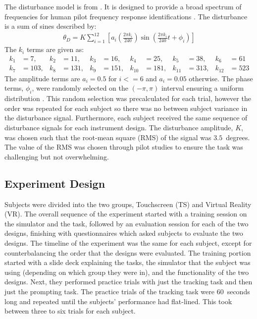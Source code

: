 The disturbance model is from \citet{sweet_identification_1999}.
It is designed to provide a broad spectrum of frequencies for human pilot frequency response identifications \citep{mcruer_mathematical_1974}.
The disturbance is a sum of sines described by:
\begin{align}
    \theta_D = K\sum\limits_{i=1}^{12} \left[ a_i \left(\frac{2\pi k_i}{240} \right) \sin\left( \frac{2\pi k_i}{240}t + \phi_i \right) \right]
\end{align}
The $k_i$ terms are given as:
\begin{align*}
    k_1 &= 7,   & k_2 &= 11,  & k_3 &= 16,  & k_4    &= 25,  & k_5    &= 38,  & k_6    &= 61 \\
    k_7 &= 103, & k_8 &= 131, & k_9 &= 151, & k_{10} &= 181, & k_{11} &= 313, & k_{12} &= 523
\end{align*}
The amplitude terms are $a_i=0.5$ for $i <= 6$ and $a_i=0.05$ otherwise.
The phase terms, $\phi_i$, were randomly selected on the $(-\pi, \pi)$ interval ensuring a uniform distribution \citep{sweet_identification_1999}.
This random selection was precalculated for each trial, however the order was repeated for each subject so there was no between subject variance in the disturbance signal.
Furthermore, each subject received the same sequence of disturbance signals for each instrument design.
The disturbance amplitude, $K$, was chosen such that the root-mean square (RMS) of the signal was $3.5$~degrees.
The value of the RMS was chosen through pilot studies to ensure the task was challenging but not overwhelming.

\subsection{Experiment Design}

Subjects were divided into the two groups, Touchscreen (TS) and Virtual Reality (VR).
The overall sequence of the experiment started with a training session on the simulator and the task, followed by an evaluation session for each of the two designs, finishing with questionnaires which asked subjects to evaluate the two designs.
The timeline of the experiment was the same for each subject, except for counterbalancing the order that the designs were evaluated.
The training portion started with a slide deck explaining the tasks, the simulator that the subject was using (depending on which group they were in), and the functionality of the two designs.
Next, they performed practice trials with just the tracking task and then just the prompting task.
The practice trials of the tracking task were 60~seconds long and repeated until the subjects' performance had flat-lined.
This took between three to six trials for each subject.

